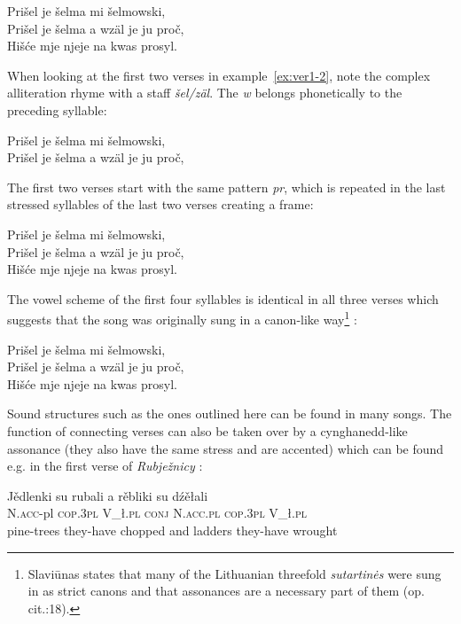 \documentclass[output=paper,hidelinks]{langscibook}
\begin{document}
\ea 
Prišel je šelma mi šelmowski,\\

Prišel je šelma a wzäl je ju proč,\\

Hišće mje njeje na kwas prosyl.\\
\z

 
When looking at the first two verses in example~\ref{ex:ver1-2}, note the complex alliteration rhyme with a staff \textit{šel/zäl}. The \textit{w} belongs phonetically to the preceding syllable:
 

\ea
Prišel je šelma mi šelmowski,\\
Prišel je šelma a wzäl je ju proč,
\label{ex:ver1-2}
\z

 
The first two verses start with the same pattern \textit{pr}, which is repeated in the last stressed syllables of the last two verses creating a frame:
 

\ea
Prišel je šelma mi šelmowski,\\
Prišel je šelma a wzäl je ju proč,\\
Hišće mje njeje na kwas prosyl.
\z

 
The vowel scheme of the first four syllables is identical in all three verses which suggests that the song was originally sung in a canon-like way\footnote{Slaviūnas states that many of the Lithuanian threefold \textit{sutartin\.es} were sung in as strict canons \citep[14]{Slaviunas1958} and that assonances are a necessary part of them (op. cit.:18).} :
 

\ea
Prišel je šelma mi šelmowski, \\
Prišel je šelma a wzäl je ju proč,\\
Hišće mje njeje na kwas prosyl.
\z

 
Sound structures such as the ones outlined here can be found in many songs. The function of connecting verses can also be taken over by a cynghanedd-like assonance (they also have the same stress and are accented) which can be found e.g. in the first verse of \textit{Rubježnicy} \citep[29]{HauptSmoler1843}:
 

\ea\glll Jědlenki su rubali a rěbliki su dźěłali \\
N.\textsc{acc}-pl \textsc{cop}.\textsc{3pl} V\_ł.\textsc{pl} \textsc{conj} N.\textsc{acc}.\textsc{pl} \textsc{cop}.\textsc{3pl} V\_ł.\textsc{pl}\\
pine-trees they-have chopped and ladders they-have wrought\\

 \glt{}
\z
 
\end{document}
